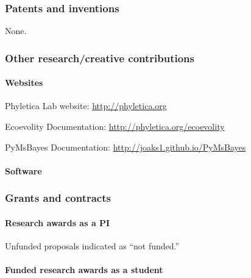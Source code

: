 \subsubsection{Patents and inventions}
None.

\subsubsection{Other research/creative contributions}
 
\paragraph{Websites}
\begin{tightItemize}
    \item Phyletica Lab website: \url{http://phyletica.org}
    \item Ecoevolity Documentation: \url{http://phyletica.org/ecoevolity}
    \item PyMsBayes Documentation: \url{http://joaks1.github.io/PyMsBayes}
\end{tightItemize}

\paragraph{Software}


\subsubsection{Grants and contracts}

\paragraph{Research awards as a PI}
Unfunded proposals indicated as ``not funded.''




\paragraph{Funded research awards as a student}


